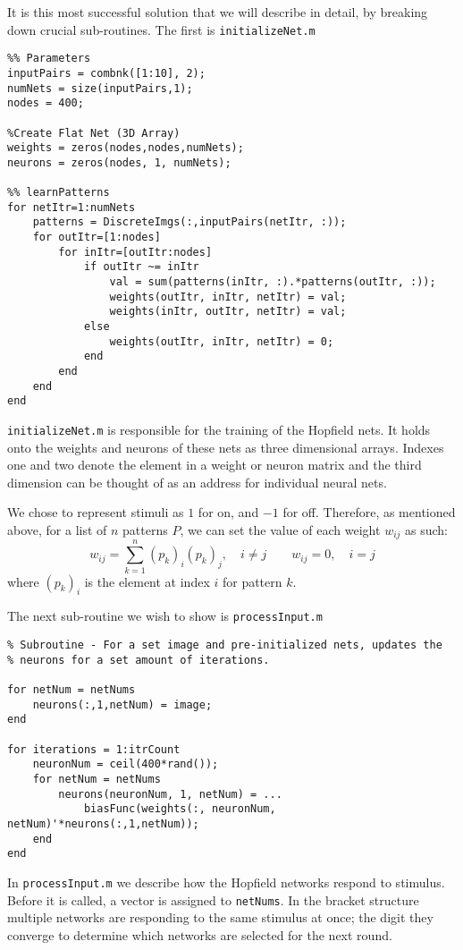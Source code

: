 \documentclass[]{article}
\theoremstyle{plain}
\theoremstyle{definition}
\begin{document}
It is this most successful solution that we will describe in detail, by breaking down crucial sub-routines. The first is \texttt{initializeNet.m}

\singlespacing
\begin{verbatim}
%% Parameters
inputPairs = combnk([1:10], 2);
numNets = size(inputPairs,1);
nodes = 400;

%Create Flat Net (3D Array)
weights = zeros(nodes,nodes,numNets);
neurons = zeros(nodes, 1, numNets);

%% learnPatterns
for netItr=1:numNets
    patterns = DiscreteImgs(:,inputPairs(netItr, :));
    for outItr=[1:nodes] 
        for inItr=[outItr:nodes]
            if outItr ~= inItr
                val = sum(patterns(inItr, :).*patterns(outItr, :));
                weights(outItr, inItr, netItr) = val;
                weights(inItr, outItr, netItr) = val;
            else
                weights(outItr, inItr, netItr) = 0;
            end
        end
    end
end
\end{verbatim}
\doublespacing
\texttt{initializeNet.m} is responsible for the training of the Hopfield nets. It holds onto the weights and neurons of these nets as three dimensional arrays. Indexes one and two denote the element in a weight or neuron matrix and the third dimension can be thought of as an address for individual neural nets. 

We chose to represent stimuli as $ 1 $ for on, and $ -1 $ for off. Therefore, as mentioned above, for a list of $ n $ patterns $ P $, we can set the value of each weight $ w_{ij} $ as such:
\[ w_{ij} = \sum\limits_{k = 1}^{n}(p_{k})_i(p_{k})_j, \quad i\neq j \qquad w_{ij} = 0, \quad i=j \] where $ (p_k)_i $ is the element at index $ i $ for pattern $ k $.

The next sub-routine we wish to show is \texttt{processInput.m}

\singlespacing
\begin{verbatim}
% Subroutine - For a set image and pre-initialized nets, updates the
% neurons for a set amount of iterations. 

for netNum = netNums
    neurons(:,1,netNum) = image;
end

for iterations = 1:itrCount
    neuronNum = ceil(400*rand());
    for netNum = netNums
        neurons(neuronNum, 1, netNum) = ...
            biasFunc(weights(:, neuronNum, netNum)'*neurons(:,1,netNum));
    end
end
\end{verbatim}
\doublespacing
\quad In \texttt{processInput.m} we describe how the Hopfield networks respond to stimulus. Before it is called, a vector is assigned to \texttt{netNums}. In the bracket structure multiple networks are responding to the same stimulus at once; the digit they converge to determine which networks are selected for the next round. 
\end{document}
